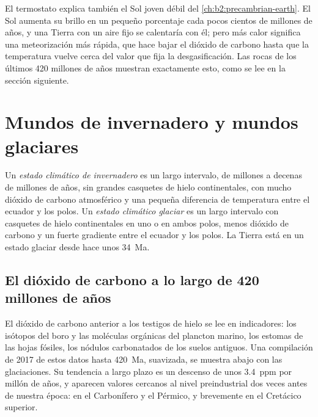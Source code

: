 El termostato explica también el Sol joven débil del \cref{ch:b2:precambrian-earth}. El Sol aumenta su brillo
en un pequeño porcentaje cada pocos cientos de millones de años, y una Tierra con un aire fijo se calentaría con él;
pero más calor significa una meteorización más rápida, que hace bajar el dióxido de carbono hasta que la temperatura
vuelve cerca del valor que fija la desgasificación. Las rocas de los últimos 420 millones de años muestran exactamente
esto, como se lee en la sección siguiente.

\section{Mundos de invernadero y mundos glaciares}\label{sec:b2:deep-time-climate:states}

\begin{definition}\label{def:b2:deep-time-climate:states}
Un \emph{estado climático de invernadero} es un largo intervalo, de millones a
decenas de millones de años, sin grandes casquetes de hielo continentales, con mucho dióxido de carbono
atmosférico y una pequeña diferencia de temperatura entre el ecuador y los polos. Un \emph{estado climático
glaciar} es un largo intervalo con casquetes de hielo continentales en uno
o en ambos polos, menos dióxido de carbono y un fuerte gradiente entre el ecuador y los polos. La Tierra está en un
estado glaciar desde hace unos \qty{34}{Ma}.
\end{definition}

\subsection*{El dióxido de carbono a lo largo de 420 millones de años}

El dióxido de carbono anterior a los testigos de hielo se lee en indicadores: los isótopos del boro y las moléculas orgánicas
del plancton marino, los estomas de las hojas fósiles, los nódulos carbonatados de los suelos antiguos. Una
compilación de 2017 de estos datos hasta \qty{420}{Ma}, suavizada, se muestra abajo con las glaciaciones. Su
tendencia a largo plazo es un descenso de unos \qty{3.4}{ppm} por millón de años, y aparecen valores cercanos al
nivel preindustrial dos veces antes de nuestra época: en el Carbonífero y el Pérmico, y
brevemente en el Cretácico superior.

